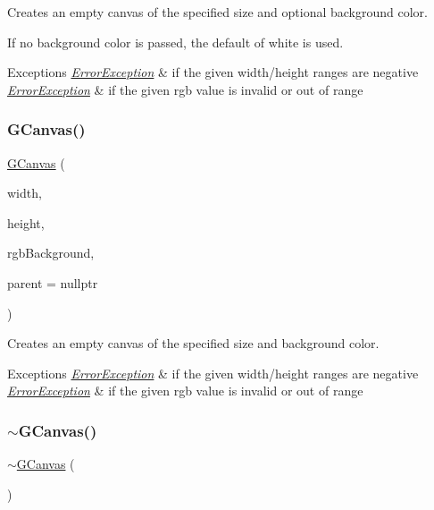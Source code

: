 Creates an empty canvas of the specified size and optional background color. 

If no background color is passed, the default of white is used. 
\begin{DoxyExceptions}{Exceptions}
{\em \mbox{\hyperlink{classErrorException}{Error\+Exception}}} & if the given width/height ranges are negative \\
\hline
{\em \mbox{\hyperlink{classErrorException}{Error\+Exception}}} & if the given rgb value is invalid or out of range \\
\hline
\end{DoxyExceptions}
\mbox{\label{classGCanvas_acc055a20116c6767125897b0a851e5cb}} 
\subsubsection{\texorpdfstring{G\+Canvas()}{GCanvas()}\hspace{0.1cm}{\footnotesize\ttfamily [4/4]}}
{\footnotesize\ttfamily \mbox{\hyperlink{classGCanvas}{G\+Canvas}} (\begin{DoxyParamCaption}\item[{double}]{width,  }\item[{double}]{height,  }\item[{const std\+::string \&}]{rgb\+Background,  }\item[{Q\+Widget $\ast$}]{parent = {\ttfamily nullptr} }\end{DoxyParamCaption})}



Creates an empty canvas of the specified size and background color. 


\begin{DoxyExceptions}{Exceptions}
{\em \mbox{\hyperlink{classErrorException}{Error\+Exception}}} & if the given width/height ranges are negative \\
\hline
{\em \mbox{\hyperlink{classErrorException}{Error\+Exception}}} & if the given rgb value is invalid or out of range \\
\hline
\end{DoxyExceptions}
\mbox{\label{classGCanvas_a6b9dcf515cbbdf3432aea0946f5cc15f}} 
\subsubsection{\texorpdfstring{$\sim$\+G\+Canvas()}{~GCanvas()}}
{\footnotesize\ttfamily $\sim$\mbox{\hyperlink{classGCanvas}{G\+Canvas}} (\begin{DoxyParamCaption}{ }\end{DoxyParamCaption})\hspace{0.3cm}{\ttfamily [virtual]}}



